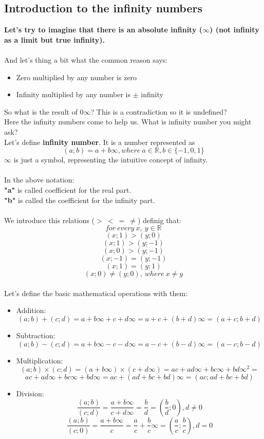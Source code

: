 \documentclass[]{article}
\begin{document}
		\subsection{Introduction to the infinity numbers}
			\large{\textbf{Let's try to imagine that there is an absolute infinity ($\infty$) (not infinity as a limit but true infinity).}} \\\\
			And let's thing a bit what the common reason says:
			\begin{itemize}
				\item Zero multiplied by any number is zero
				\item Infinity multiplied by any number is $\pm$ infinity
			\end{itemize}
			So what is the result of $0\infty$? This is a contradiction so it is undefined? \\
			Here the infinity numbers come to help us. What is infinity number you might ask? \\
			Let's define \textbf{infinity number}. It is a number represented as
			$$ (a; b) = a + b\infty, where\ a \in \mathbb{R}, b \in \{-1, 0, 1\}$$
			\textbf{$\infty$} is just a symbol, representing the intuitive concept of infinity.\\\\
			In the above notation:\\
			\textbf{"a"} is called coefficient for the real part.\\
			\textbf{"b"} is called the coefficient for the infinity part.\\\\
			We introduce this relations ($>\ <\ =\ \neq$) definig that:\\
			$$for\ every\ x,\ y \in \mathbb{R}$$
			$$ (x; 1) > (y; 0)$$
			$$ (x; 1) > (y; -1)$$
			$$ (x; 0) > (y; -1)$$
			$$ (x; -1) = (y; -1)$$
			$$ (x; 1) = (y; 1)$$
			$$ (x; 0) \neq (y; 0),\ where\ x \neq y$$\\
			\newpage
			Let's define the basic mathematical operations with them:
			\begin{itemize}
				\item Addition: $$ (a; b) + (c; d) = a + b\infty + c + d\infty = a + c + (b + d)\infty = (a + c; b + d)$$
				\item Subtraction: $$ (a; b) - (c; d) = a + b\infty - c - d\infty = a - c + (b - d)\infty = (a - c; b - d)$$
				\item Multiplication: $$ (a; b) \times (c; d) = (a + b\infty) \times (c + d\infty) = ac + ad\infty + bc\infty + bd{\infty}^2 =$$$$ ac + ad\infty + bc\infty + bd\infty = ac + (ad + bc + bd)\infty = (ac; ad + bc + bd)$$
				\item Division: $$\frac{ (a; b)}{ (c; d)} = \frac{a + b\infty}{c + d\infty} = \frac{b}{d} = (\frac{b}{d}; 0) , d \neq 0$$
				                $$\frac{ (a; b)}{ (c; 0)} = \frac{a + b\infty}{c} = \frac{a}{c} + \frac{b}{c}\infty = (\frac{a}{c}; \frac{b}{c}) , d = 0$$
     		\end{itemize}
\end{document}
